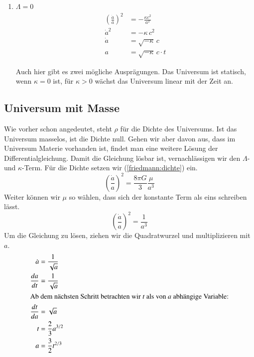 \begin{refsection}
\begin{enumerate}
		
	\item $\Lambda = 0$ 
		\begin{align}
			\nonumber \left(\frac{\dot{a}}{a}\right) ^2 &= - \frac{\kappa c^2}{a^2}\\
			\nonumber \dot{a} ^2 &= - \kappa \, c^2 \\
			\nonumber \dot{a} &= \sqrt{- \kappa}\, c \\
			a &= \sqrt{- \kappa}\, c \cdot t \label{friedmann:Kappa}
		\end{align}
		
Auch hier gibt es zwei mögliche Ausprägungen. Das Universum ist statisch, wenn $\kappa = 0$ ist, für $\kappa > 0$ wächst das Universum linear mit der Zeit an.
	
\end{enumerate}

\subsection{Universum mit Masse \label{friedmann:UniversumMitMasse}} 
Wie vorher schon angedeutet, steht $\rho$ für die Dichte des Universums. Ist das Universum masselos, ist die Dichte null. Gehen wir aber davon aus, dass im Universum Materie vorhanden ist, findet man eine weitere Lösung der Differentialgleichung. Damit die Gleichung lösbar ist, vernachlässigen wir den $\Lambda$- und $\kappa$-Term. Für die Dichte setzen wir (\ref{friedmann:dichte}) ein. 
\[\left(\frac{\dot{a}}{a}\right) ^2 = \frac{8 \pi G}{3} \frac{\mu}{a^3}\]
Weiter können wir $\mu$ so wählen, dass sich der konstante Term als eins schreiben lässt.
\[\left(\frac{\dot{a}}{a}\right) ^2 = \frac{1}{a^3}\]
Um die Gleichung zu lösen, ziehen wir die Quadratwurzel und multiplizieren mit $a$.
\begin{align}
	\nonumber \dot{a} &= \frac{1}{\sqrt{a}} \\
	\nonumber \frac{da}{dt} &=\frac{1}{\sqrt{a}} \\
	\intertext{Ab dem nächsten Schritt betrachten wir $t$ als von $a$ abhängige Variable:}
	\nonumber \frac{dt}{da} &= \sqrt{a} \\
	\nonumber t &= \frac{2}{3} a^{3/2} \\
	a &= \frac{3}{2} t^{2/3} \label{friedmann:Masse}
\end{align}


\end{refsection}
